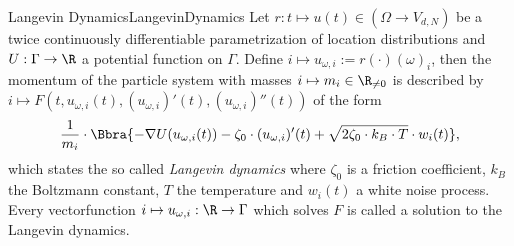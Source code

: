 \begin{mdef}{Langevin Dynamics}{LangevinDynamics}
    Let $r:t\mapsto u(t)\in(\Omega\to V_{d,N})$ be a twice continuously differentiable parametrization of location distributions and $U:\Gamma\to\R$ a potential function on $\Gamma$. Define $i\mapsto u_{\omega,i}:=r(\cdot)(\omega)_i$, then the momentum of the particle system with masses $i\mapsto m_i\in\R_{\neq 0}$ is described by $i\mapsto F(t,u_{\omega,i}(t),(u_{\omega,i})'(t),(u_{\omega,i})''(t))$ of the form 
    \[
        \frac{1}{m_i}\cdot\Bbra{-\nabla U(u_{\omega,i}(t)) - \zeta_0\cdot (u_{\omega,i})'(t) + \sqrt{2\zeta_0\cdot k_B\cdot T}\cdot w_i(t)},
    \]
    which states the so called \emph{Langevin dynamics} where $\zeta_0$ is a friction coefficient, $k_B$ the Boltzmann constant, $T$ the temperature and $w_i(t)$ a white noise process. Every vectorfunction $i\mapsto u_{\omega,i}:\R\to\Gamma$ which solves $F$ is called a solution to the Langevin dynamics.
\end{mdef}